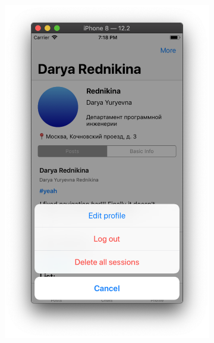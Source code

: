 \documentclass[a4paper,12pt]{article}
\begin{document}
\begin{figure}[h!]
\begin{subfigure}[b]{0.3\linewidth}
			\includegraphics[width=\linewidth]{../includes/pmi/profile_functions.png}
		\end{subfigure}
		\begin{subfigure}[b]{0.3\linewidth}

\end{subfigure}
\end{figure}
\end{document}
